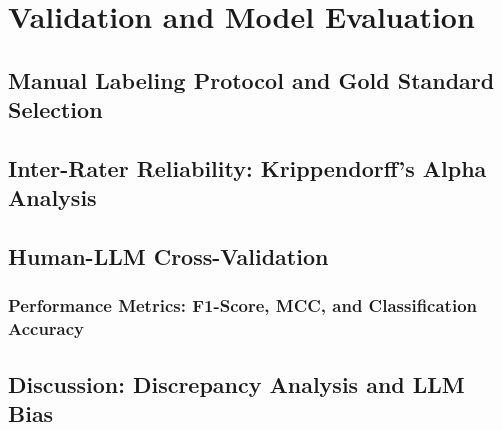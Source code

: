 \section{Validation and Model Evaluation}
    \subsection{Manual Labeling Protocol and Gold Standard Selection}
    \subsection{Inter-Rater Reliability: Krippendorff's Alpha Analysis}
    \subsection{Human-LLM Cross-Validation}
        \subsubsection{Performance Metrics: F1-Score, MCC, and Classification Accuracy}
    \subsection{Discussion: Discrepancy Analysis and LLM Bias}